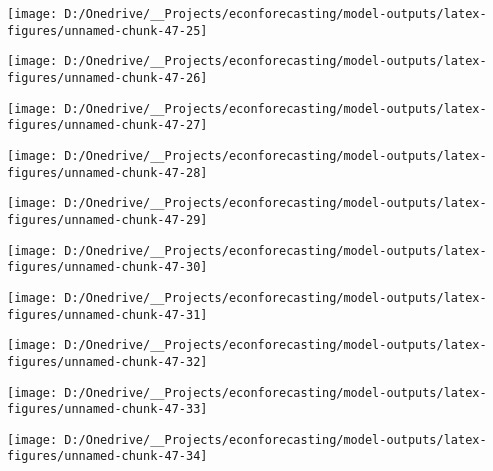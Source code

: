 \documentclass[11pt, letterpaper]{article}\usepackage[]{graphicx}\usepackage[]{color}
\begin{document}
{\centering \texttt{[image: D:/Onedrive/\_\_Projects/econforecasting/model-outputs/latex-figures/unnamed-chunk-47-25]} 

}




{\centering \texttt{[image: D:/Onedrive/\_\_Projects/econforecasting/model-outputs/latex-figures/unnamed-chunk-47-26]} 

}




{\centering \texttt{[image: D:/Onedrive/\_\_Projects/econforecasting/model-outputs/latex-figures/unnamed-chunk-47-27]} 

}




{\centering \texttt{[image: D:/Onedrive/\_\_Projects/econforecasting/model-outputs/latex-figures/unnamed-chunk-47-28]} 

}




{\centering \texttt{[image: D:/Onedrive/\_\_Projects/econforecasting/model-outputs/latex-figures/unnamed-chunk-47-29]} 

}




{\centering \texttt{[image: D:/Onedrive/\_\_Projects/econforecasting/model-outputs/latex-figures/unnamed-chunk-47-30]} 

}




{\centering \texttt{[image: D:/Onedrive/\_\_Projects/econforecasting/model-outputs/latex-figures/unnamed-chunk-47-31]} 

}




{\centering \texttt{[image: D:/Onedrive/\_\_Projects/econforecasting/model-outputs/latex-figures/unnamed-chunk-47-32]} 

}




{\centering \texttt{[image: D:/Onedrive/\_\_Projects/econforecasting/model-outputs/latex-figures/unnamed-chunk-47-33]} 

}




{\centering \texttt{[image: D:/Onedrive/\_\_Projects/econforecasting/model-outputs/latex-figures/unnamed-chunk-47-34]} 

}
\end{document}
